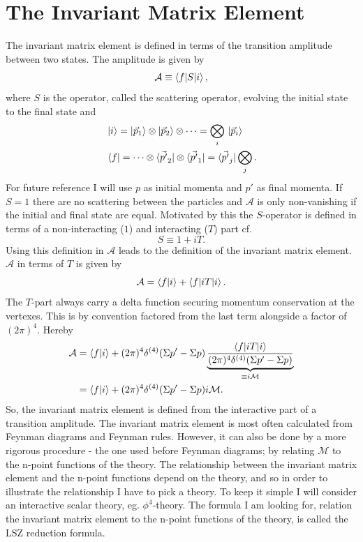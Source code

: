 \section{The Invariant Matrix Element}
The invariant matrix element is defined in terms of the transition amplitude between two states. The amplitude is given by
\begin{equation}
	\mathcal{A}\equiv \braket{f|S|i},
	\label{S1}
\end{equation} 
where $S$ is the operator, called the scattering operator, evolving the initial state to the final state and
\begin{equation}
	\begin{split}
		&\ket{i}=\ket{\vec{p}_1}\otimes \ket{\vec{p}_2}\otimes \dots =\bigotimes_{i}\,\ket{\vec{p}_i}\\
		&\bra{f}=\dots \otimes \bra{\vec{p'}_2}\otimes \bra{\vec{p'}_1}=\bra{\vec{p'}_j}\bigotimes_j.
	\end{split}
\end{equation} 
For future reference I will use $p$ as initial momenta and $p'$ as final momenta. If $S=1$ there are no scattering between the particles and $\mathcal{A}$ is only non-vanishing if the initial and final state are equal. Motivated by this the $S$-operator is defined in terms of a non-interacting ($1$) and interacting ($T$) part cf.
\begin{equation}
	S\equiv 1+iT.
	\label{S2}
\end{equation} 
Using this definition in $\mathcal{A}$ leads to the definition of the invariant matrix element. $\mathcal{A}$ in terms of $T$ is given by
\begin{equation}
	\mathcal{A}=\braket{f|i}+\braket{f|iT|i}.
	\label{S3}
\end{equation} 
The $T$-part always carry a delta function securing momentum conservation at the vertexes. This is by convention factored from the last term alongside a factor of $(2\pi)^4$. Hereby
\begin{equation}
	\begin{split}
		\mathcal{A}&=\braket{f|i}+(2\pi)^4\delta^{(4)}(\Sigma p'-\Sigma p)\underbrace{\frac{\braket{f|iT|i}}{(2\pi)^4\delta^{(4)}(\Sigma p'-\Sigma p)}}_{\equiv i\mathcal{M}}\\
		&=\braket{f|i}+(2\pi)^4\delta^{(4)}(\Sigma p'-\Sigma p)i\mathcal{M}.
	\end{split}
	\label{S4}
\end{equation} 
So, the invariant matrix element is defined from the interactive part of a transition amplitude. The invariant matrix element is most often calculated from Feynman diagrams and Feynman rules.  However, it can also be done by a more rigorous procedure - the one used before Feynman diagrams; by relating $\mathcal{M}$ to the n-point functions of the theory. The relationship between the invariant matrix element and the n-point functions depend on the theory, and so in order to illustrate the relationship I have to pick a theory. To keep it simple I will consider an interactive scalar theory, eg. $\phi^4$-theory. The formula I am looking for, relation the invariant matrix element to the n-point functions of the theory, is called the LSZ reduction formula.

